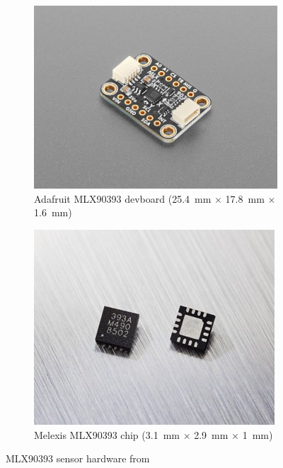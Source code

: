 \begin{figure}[ht]
    \centering
    \begin{subfigure}[b]{0.45\textwidth}
        \centering
        \includegraphics[width=\linewidth]{figures/mlx90393}
        \caption{Adafruit MLX90393 devboard (\SI{25.4}{\milli\meter} $\times$ \SI{17.8}{\milli\meter} $\times$ \SI{1.6}{\milli\meter})}
    \end{subfigure}
    \hfill
    \begin{subfigure}[b]{0.45\textwidth}
        \centering
        \includegraphics[width=\linewidth]{figures/mlx90393-chip}
        \caption{Melexis MLX90393 chip (\SI{3.1}{\milli\meter} $\times$ \SI{2.9}{\milli\meter} $\times$ \SI{1}{\milli\meter})}
    \end{subfigure}
    \caption{MLX90393 sensor hardware from \cite{MLX90393}}
    \label{fig:sensor}
\end{figure}

